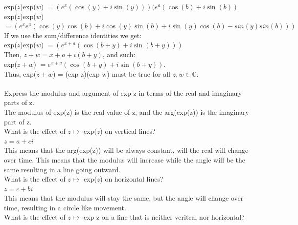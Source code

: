 \documentclass[12pt]{article}
\begin{document}
exp($z$)exp($w$) $ = (e^x(\cos(y)+i\sin(y)))(e^a(\cos(b)+i\sin(b))$\\ 
exp($z$)exp($w$) $ = (e^xe^a(\cos(y)\cos(b)+i\cos(y)\sin(b)+i\sin(y)\cos(b)-sin(y)sin(b)))$\\

If we use the sum/difference identities we get:\\ 

exp($z$)exp($w$) $ = (e^{x+a}(\cos(b+y)+i\sin(b+y)))$\\ 

Then, $z + w = x+a + i(b+y)$, and such:\\

exp($z+w$) $ = e^{x+a}(\cos(b+y) + i\sin(b+y))$.\\

Thus, exp($z+w$) = (exp z)(exp w) must be true for all $z,w \in \mathbb{C}$.\\


\\

 Express the modulus and argument of exp z in terms of the real and imaginary parts of z. \\

The modulus of exp(z) is the real value of z, and the arg(exp(z)) is the imaginary part of z.\\ 


 What is the effect of $z \mapsto $ exp($z$) on vertical lines?\\

$z = a + ci$\\

This means that the arg(exp(z)) will be always constant, will the real will change over time. 
This means that the modulus will increase while the angle will be the same resulting in a line going outward.\\ 


 What is the effect of $z \mapsto $ exp($z$) on horizontal lines?\\

$z = c + bi$\\

This means that the modulus will stay the same, but the angle will change over time, resulting in a circle like movement.\\


 What is the effect of $z \mapsto $ exp z on a line that is neither veritcal nor horizontal?\\
\end{document}
